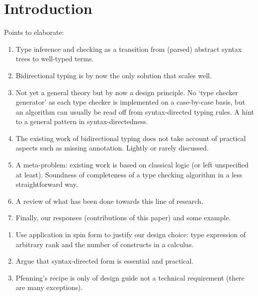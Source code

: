 
\section{Introduction}\label{sec:intro}


Points to elaborate:
\begin{enumerate}
  \item Type inference and checking as a transition from (parsed) abstract syntax trees to well-typed terms.
  \item Bidirectional typing is by now the only solution that scales well.
  \item Not yet a general theory but by now a design principle.
    No `type checker generator' as each type checker is implemented on a case-by-case basis, but an algorithm can usually be read off from syntax-directed typing rules.
    A hint to a general pattern in syntax-directedness.
  \item The existing work of bidirectional typing does not take account of practical aspects such as missing annotation.
    Lightly or rarely discussed.
  \item A meta-problem: existing work is based on classical logic (or left unspecified at least).
    Soundness of completeness of a type checking algorithm in a less straightforward way.
  \item A review of what has been done towards this line of research.
  \item Finally, our responses (contributions of this paper) and some example.
\end{enumerate}


\begin{enumerate}
  \item Use application in spin form to justify our design choice: type expression of arbitrary rank and the number of constructs in a calculus.
  \item Argue that syntax-directed form is essential and practical.
  \item Pfenning's recipe is only of design guide not a technical requirement (there are many exceptions).
\end{enumerate}

